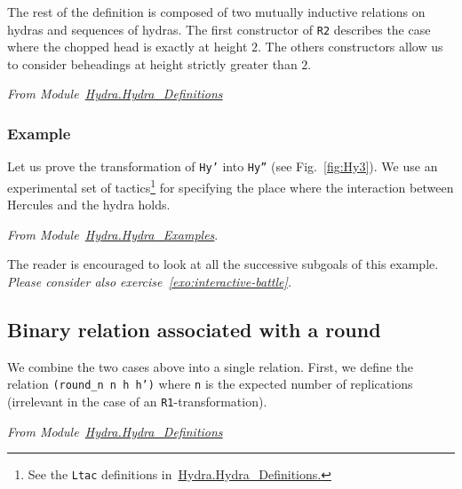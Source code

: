 


The rest of the definition is composed of two mutually inductive relations on hydras and sequences of hydras. The first constructor of \texttt{R2} describes the case where the chopped head is exactly at height $2$. The others constructors allow us to consider beheadings at height strictly greater than $2$.


\vspace{4pt}
\emph{From Module~\href{../theories/html/hydras.Hydra.Hydra_Definitions.html\#R2}{Hydra.Hydra\_Definitions}}



\subsubsection{Example}
Let us prove the transformation of \texttt{Hy'} into \texttt{Hy''} (see Fig.~\vref{fig:Hy3}). We use an experimental set of tactics\footnote{See the \texttt{Ltac} definitions in~\href{../theories/html/hydras.Hydra.Hydra_Definitions.html\#R2}{Hydra.Hydra\_Definitions.}}  for specifying the place where the 
interaction between Hercules and the hydra holds. 


\vspace{4pt}\emph{From Module~\href{../theories/html/hydras.Hydra.Hydra_Examples.html}{Hydra.Hydra\_Examples}}. 




The reader is encouraged to look at all the successive subgoals of this example.
\emph{Please consider also exercise~\vref{exo:interactive-battle}.}


\subsection{Binary relation associated with a round}

We combine the two cases above into a single relation.
First,  we define the  relation \texttt{(round\_n n h h')} where \texttt{n} is the expected number of  replications (irrelevant in the case of an \texttt{R1}-transformation).

\vspace{4pt}
\emph{From Module~\href{../theories/html/hydras.Hydra.Hydra_Definitions.html\#round_n}{Hydra.Hydra\_Definitions}}


